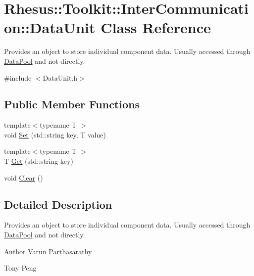 \hypertarget{class_rhesus_1_1_toolkit_1_1_inter_communication_1_1_data_unit}{\section{Rhesus\-:\-:Toolkit\-:\-:Inter\-Communication\-:\-:Data\-Unit Class Reference}
\label{class_rhesus_1_1_toolkit_1_1_inter_communication_1_1_data_unit}
}


Provides an object to store individual component data. Usually accessed through \hyperlink{class_rhesus_1_1_toolkit_1_1_inter_communication_1_1_data_pool}{Data\-Pool} and not directly.  




{\ttfamily \#include $<$Data\-Unit.\-h$>$}

\subsection*{Public Member Functions}
\begin{DoxyCompactItemize}
\item 
{\footnotesize template$<$typename T $>$ }\\void \hyperlink{class_rhesus_1_1_toolkit_1_1_inter_communication_1_1_data_unit_a0d79bf260ade60bb01c24ce754e05d80}{Set} (std\-::string key, T value)
\item 
{\footnotesize template$<$typename T $>$ }\\T \hyperlink{class_rhesus_1_1_toolkit_1_1_inter_communication_1_1_data_unit_ae0c0d69ba6e401ff8db2ffd63cc4e5eb}{Get} (std\-::string key)
\item 
void \hyperlink{class_rhesus_1_1_toolkit_1_1_inter_communication_1_1_data_unit_a9e49e0086e134e98cb097746bbcd82d5}{Clear} ()
\end{DoxyCompactItemize}


\subsection{Detailed Description}
Provides an object to store individual component data. Usually accessed through \hyperlink{class_rhesus_1_1_toolkit_1_1_inter_communication_1_1_data_pool}{Data\-Pool} and not directly. 

\begin{DoxyAuthor}{Author}
Varun Parthasarathy 

Tony Peng 
\end{DoxyAuthor}


